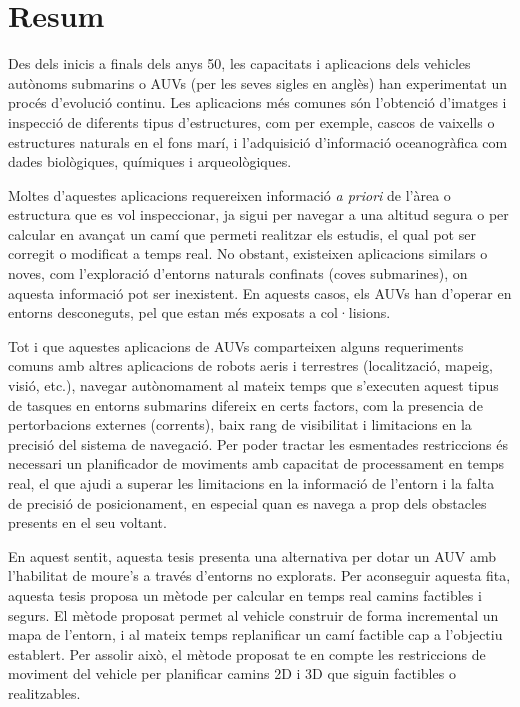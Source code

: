 \begingroup
\let\clearpage\relax
\let\cleardoublepage\relax
\let\cleardoublepage\relax

\chapter*{Resum}

Des dels inicis a finals dels anys 50, les capacitats i aplicacions dels
vehicles autònoms submarins o AUVs (per les seves sigles en anglès) han
experimentat un procés d'evolució continu. Les aplicacions més comunes són
l’obtenció d'imatges i inspecció de diferents tipus d'estructures, com per
exemple, cascos de vaixells o estructures naturals en el fons marí, i
l'adquisició d'informació oceanogràfica com dades biològiques, químiques i
arqueològiques.

Moltes d'aquestes aplicacions requereixen informació \textit{a priori} de l'àrea
o estructura que es vol inspeccionar, ja sigui per navegar a una altitud segura
o per calcular en avançat un camí que permeti realitzar els estudis, el qual pot
ser corregit o modificat a temps real. No obstant, existeixen aplicacions
similars o noves, com l'exploració d'entorns naturals confinats (\eg coves
submarines), on aquesta informació pot ser inexistent. En aquests casos, els
AUVs han d'operar en entorns desconeguts, pel que estan més exposats a
col·lisions.

Tot i que aquestes aplicacions de AUVs comparteixen alguns requeriments comuns
amb altres aplicacions de robots aeris i terrestres (\eg localització, mapeig,
visió, etc.), navegar autònomament al mateix temps que s'executen aquest tipus
de tasques en entorns submarins difereix en certs factors, com la presencia de
pertorbacions externes (corrents), baix rang de visibilitat i limitacions en la
precisió del sistema de navegació. Per poder tractar les esmentades restriccions
és necessari un planificador de moviments amb capacitat de processament en temps
real, el que ajudi a superar les limitacions en la informació de l'entorn i la
falta de precisió de posicionament, en especial quan es navega a prop dels
obstacles presents en el seu voltant.

En aquest sentit, aquesta tesis presenta una alternativa per dotar un AUV amb
l'habilitat de moure’s a través d'entorns no explorats. Per aconseguir aquesta
fita, aquesta tesis proposa un mètode per calcular en temps real camins
factibles i segurs. El mètode proposat permet al vehicle construir de forma
incremental un mapa de l'entorn, i al mateix temps replanificar un camí factible
cap a l'objectiu establert. Per assolir això, el mètode proposat te en compte
les restriccions de moviment del vehicle per planificar camins 2D i 3D que
siguin factibles o realitzables.


